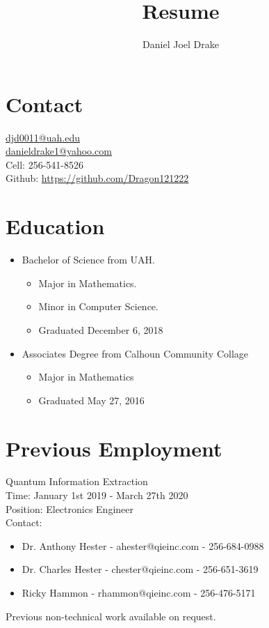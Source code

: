 \documentclass[10pt]{extarticle}
\title{
	Resume \\
}
\author{Daniel Joel Drake}
\theoremstyle{plain}
\theoremstyle{Definition}
\theoremstyle{Definition}
\theoremstyle{plain}
\begin{document}
	\twocolumn
	\maketitle		
	\noindent
	\section{Contact}
	\href{mailto:djd0011@uah.edu}{djd0011@uah.edu}  \\
	\href{mailto:danieldrake1@yahoo.com}{danieldrake1@yahoo.com}  \\
	Cell: 256-541-8526  \\
	Github: \href{https://github.com/Dragon121222}{https://github.com/Dragon121222} 
	\section{Education}
		\begin{itemize}
			\item Bachelor of Science from UAH.
			\begin{itemize}
				\item Major in Mathematics.
				\item Minor in Computer Science.
				\item Graduated December 6, 2018
		\end{itemize}
			\item Associates Degree from Calhoun Community Collage
			\begin{itemize}
				\item Major in Mathematics
				\item Graduated May 27, 2016
			\end{itemize}
		\end{itemize}
	\section{Previous Employment}
		Quantum Information Extraction \\
		Time: January 1st 2019 - March 27th 2020 \\ 
		Position: Electronics Engineer \\	 
		Contact: 
		\begin{itemize}
			\item Dr. Anthony Hester - ahester@qieinc.com - 256-684-0988
			\item Dr. Charles Hester - chester@qieinc.com - 256-651-3619
			\item Ricky Hammon - rhammon@qieinc.com - 256-476-5171
		\end{itemize}	
	Previous non-technical work available on request. 
\end{document}
